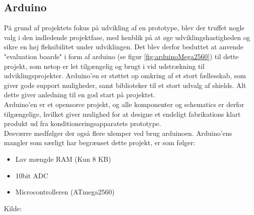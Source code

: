 \subsection{Arduino}
\begin{minipage}[t]{0.6\textwidth}
På grund af projektets fokus på udvikling af en prototype, blev der truffet nogle valg i den indledende projektfase, med henblik på at øge udviklingshastigheden og sikre en høj fleksibilitet under udviklingen. Det blev derfor besluttet at anvende "evaluation boards" i form af arduino (se figur \ref{fig:arduinoMega2560}) til dette projekt, som netop er let tilgængelig og brugt i vid udstrækning til udviklingsprojekter. Arduino'en er støttet op omkring af et stort fællesskab, som giver gode support muligheder, samt biblioteker til et stort udvalg af shields. Alt dette giver anledning til en god start på projektet.\\

Arduino'en er et opensorce projekt, og alle komponenter og schematics er derfor tilgængelige, hvilket giver mulighed for at designe et endeligt fabrikations klart produkt ud fra konditioneringsapparatets prototype.\\

Desværre medfølger der også flere ulemper ved brug arduinoen. Arduino'ens mangler som særligt har begrænset dette projekt, er som følger:\\

\begin{itemize}
	\item Lav mængde RAM (Kun 8 KB) 
	\item 10bit ADC
	\item Microcontrolleren (ATmega2560)
\end{itemize}
Kilde: \cite{RefWorks:40}

\end{minipage}
